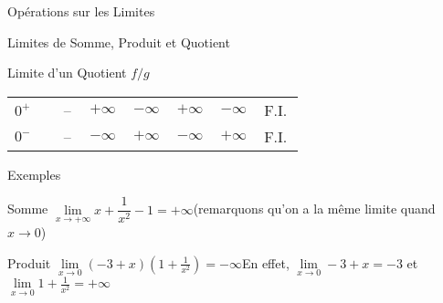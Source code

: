 \documentclass{cours}
\begin{document}
\begin{Gpartie}{Opérations sur les Limites}
\begin{Spartie}{Limites de Somme, Produit et Quotient}
\begin{SSpartie}{Limite d'un Quotient $f/g$}
\begin{table}[H]
\begin{tabular}{ p{0.15\linewidth} *{6}{M{0.08\linewidth}} }
                        $0^+$ & -- & $+\infty$ & $-\infty$ & $+\infty$ & $-\infty$ & F.I. \\
                        $0^-$ & -- & $-\infty$ & $+\infty$ & $-\infty$ & $+\infty$ & F.I. \\ \bottomrule
                    \end{tabular}
                \end{table}
            \end{SSpartie}
            \begin{SSpartie}{Exemples} 
                \begin{SSSpartie}{Somme} 
                    $\lim\limits_{x\to+\infty}x+\dfrac{1}{x^2}-1=+\infty$\quad(remarquons qu'on a la même limite quand $x\to0$)
                \end{SSSpartie}
                \begin{SSSpartie}{Produit} 
                    $\lim\limits_{x\to0}\left(-3+x\right)\left(1+\frac{1}{x^2}\right)=-\infty$\qquad En effet, $\lim\limits_{x\to0}-3+x=-3$ et $\lim\limits_{x\to0}1+\frac{1}{x^2}=+\infty$
    

\end{SSSpartie}
\end{SSpartie}
\end{Spartie}
\end{Gpartie}
\end{document}
